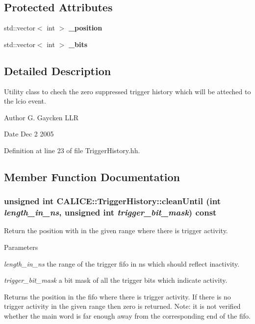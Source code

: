 \subsection*{Protected Attributes}
\begin{DoxyCompactItemize}
\item 
std::vector$<$ int $>$ {\bfseries \_\-position}\label{classCALICE_1_1TriggerHistory_ad59b4b6e6e84d9df1d5bd324e2617d7c}

\item 
std::vector$<$ int $>$ {\bfseries \_\-bits}\label{classCALICE_1_1TriggerHistory_a430ba6e3d127804159a1b4cd90975139}

\end{DoxyCompactItemize}


\subsection{Detailed Description}
Utility class to chech the zero suppressed trigger history which will be atteched to the lcio event. \begin{DoxyAuthor}{Author}
G. Gaycken LLR 
\end{DoxyAuthor}
\begin{DoxyDate}{Date}
Dec 2 2005 
\end{DoxyDate}


Definition at line 23 of file TriggerHistory.hh.

\subsection{Member Function Documentation}
\subsubsection[{cleanUntil}]{\setlength{\rightskip}{0pt plus 5cm}unsigned int CALICE::TriggerHistory::cleanUntil (int {\em length\_\-in\_\-ns}, \/  unsigned int {\em trigger\_\-bit\_\-mask}) const\hspace{0.3cm}{\ttfamily  [inline]}}\label{classCALICE_1_1TriggerHistory_ad30c03af25d0fdad13676b74d7f7ac43}


Return the position with in the given range where there is trigger activity. 
\begin{DoxyParams}{Parameters}
\item[{\em length\_\-in\_\-ns}]the range of the trigger fifo in ns which should reflect inactivity. \item[{\em trigger\_\-bit\_\-mask}]a bit mask of all the trigger bits which indicate activity. \end{DoxyParams}
\begin{DoxyReturn}{Returns}
the position in the fifo where there is trigger activity. If there is no trigger activity in the given range then zero is returned. Note: it is not verified whether the main word is far enough away from the corresponding end of the fifo. 
\end{DoxyReturn}


